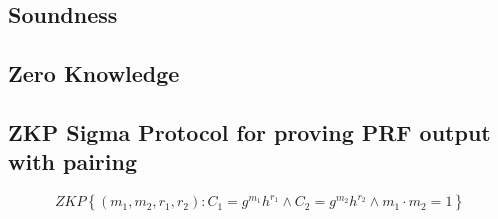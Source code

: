 \subsection{Soundness}

\subsection{Zero Knowledge}


\subsection{ZKP Sigma Protocol for proving PRF output with pairing}

\[
ZKP
    \left\{ 
    (m_1, m_2, r_1, r_2): C_1 = g^{m_1}h^{r_1} \wedge C_2 = g^{m_2}h^{r_2} \wedge m_1 \cdot m_2 = 1
    \right\}
\]